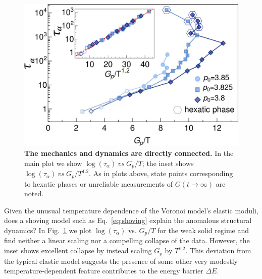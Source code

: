 \documentclass[aps,reprint,superscriptaddress,nofootinbib, notitlepage,prl]{revtex4-2}
\begin{document}
\begin{figure}[b]
	\centering
	\includegraphics[width=1\linewidth]{connection.jpg}
	\caption{\textbf{The mechanics and dynamics are directly connected.}
		In the main plot we show $\log (\tau_\alpha) \ vs\ G_p/T$; the inset shows $\log (\tau_\alpha) \ vs\ G_p/T^{1.2}$.
		As in plots above, state points corresponding to hexatic phases or unreliable measurements of $G(t\rightarrow\infty)$ are noted. 
	}
	\label{fig:connection}
\end{figure}

Given the unusual temperature dependence of the Voronoi model's elastic moduli, does a shoving model such as Eq.~\eqref{eq:shoving} explain the anomalous structural dynamics?
In Fig.~\ref{fig:connection} we plot $\log(\tau_\alpha)$ vs. $G_p/T$ for the weak solid regime and find neither a linear scaling nor a compelling collapse of the data.
However, the inset shows excellent collapse by instead scaling $G_p$ by $T^{1.2}$.
This deviation from the typical elastic model suggests the presence of some other very modestly temperature-dependent feature contributes to the energy barrier $\Delta E$.

\end{document}
